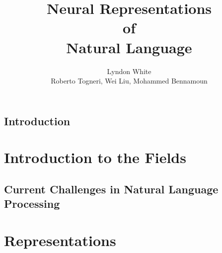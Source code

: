 \documentclass[12pt,parskip]{komatufte}
\begin{document}
\title{Neural Representations \\of\\ Natural Language}
\author{Lyndon White\\ Roberto Togneri, Wei Liu, Mohammed Bennamoun}
\publishers{SpringerBriefs in Computer Science}

\maketitle
\tableofcontents

\chapter{Introduction}\label{sec:introduction}

\part{Introduction to the Fields}\label{sec:introduction-to-the-fields}




\chapter{Current Challenges in Natural Language Processing}\label{sec:current-challenges-in-natural-language-processing}

\part{Representations}\label{sec:representations}
\end{document}
